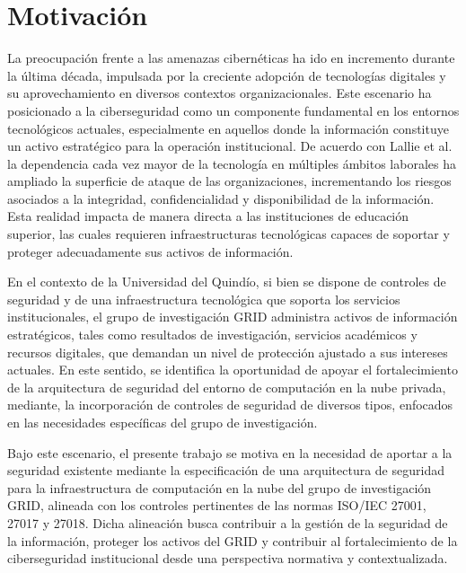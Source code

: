 \section{Motivación}\label{sec:Motivacion}

La preocupación frente a las amenazas cibernéticas ha ido en incremento durante la última década, impulsada por la creciente 
adopción de tecnologías digitales y su aprovechamiento en diversos contextos organizacionales. Este escenario ha posicionado a la 
ciberseguridad como un componente fundamental en los entornos tecnológicos actuales, especialmente en aquellos donde la información
constituye un activo estratégico para la operación institucional. De acuerdo con Lallie et al.~\cite{lallie2025cyberattacks} la 
dependencia cada vez mayor de la tecnología en múltiples ámbitos laborales ha ampliado la superficie de ataque de las organizaciones, 
incrementando los riesgos asociados a la integridad, confidencialidad y disponibilidad de la información. Esta realidad impacta de 
manera directa a las instituciones de educación superior, las cuales requieren infraestructuras tecnológicas capaces de soportar y 
proteger adecuadamente sus activos de información.~\cite{educause2023cybersecurity}

En el contexto de la Universidad del Quindío, si bien se dispone de controles de seguridad y de una infraestructura
tecnológica que soporta los servicios institucionales, el grupo de investigación GRID administra activos de información
estratégicos, tales como resultados de investigación, servicios académicos y recursos digitales, que demandan un nivel de
protección ajustado a sus intereses actuales. En este sentido, se identifica la oportunidad de apoyar el fortalecimiento de
la arquitectura de seguridad del entorno de computación en la nube privada, mediante, la incorporación de controles de seguridad
de diversos tipos, enfocados en las necesidades específicas del grupo de investigación.~\cite{edutech2024cybersecurity}

Bajo este escenario, el presente trabajo se motiva en la necesidad de aportar a la seguridad existente
mediante la especificación de una arquitectura de seguridad para la infraestructura de computación en la nube del grupo de
investigación GRID, alineada con los controles pertinentes de las normas ISO/IEC 27001, 27017 y 27018. Dicha alineación
busca contribuir a la gestión de la seguridad de la información, proteger los activos del GRID y
contribuir al fortalecimiento de la ciberseguridad institucional desde una perspectiva normativa y contextualizada.